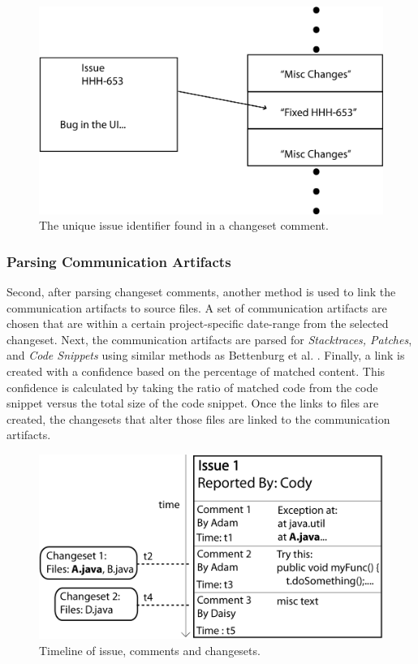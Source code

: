 \documentclass[conference]{IEEEtran}
\begin{document}
\begin{figure}[b!]
\centering
\includegraphics[width=1.0\columnwidth]{CommitsTochangesets1}
\caption{The unique issue identifier found in a changeset comment.\label{fig:identifier}}
\end{figure}

\subsubsection{Parsing Communication Artifacts}
\label{sec:parse}
Second, after parsing changeset comments, another method is used to link the communication artifacts to source files.  A set of communication artifacts are chosen that are within a certain project-specific date-range from the selected changeset.  Next, the communication artifacts are parsed for \textit{Stacktraces, Patches}, and \textit{Code Snippets} using similar methods as Bettenburg et al. \cite{Bettenburg:2008:ESI:1370750.1370757}.  Finally, a link is created with a confidence based on the percentage of matched content.  This confidence is calculated by taking the ratio of matched code from the code snippet versus the total size of the code snippet. Once the links to files are created, the changesets that alter those files are linked to the communication artifacts.

\begin{figure}[t!]
\centering
\includegraphics[width=1.0\columnwidth]{Items}
\caption{Timeline of issue, comments and changesets.\label{fig:items}}
\end{figure}
\end{document}
